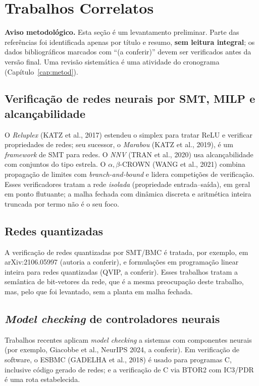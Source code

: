 \chapter{Trabalhos Correlatos}\label{cap:corr}

\textbf{Aviso metodológico.} Esta seção é um levantamento preliminar. Parte das referências foi identificada apenas por título e resumo, \textbf{sem leitura integral}; os dados bibliográficos marcados com ``(a conferir)'' devem ser verificados antes da versão final. Uma revisão sistemática é uma atividade do cronograma (Capítulo~\ref{cap:metod}).

\section{Verificação de redes neurais por SMT, MILP e alcançabilidade}

O \emph{Reluplex} (KATZ et al., 2017) estendeu o simplex para tratar ReLU e verificar propriedades de redes; seu sucessor, o \emph{Marabou} (KATZ et al., 2019), é um \emph{framework} de SMT para redes. O \emph{NNV} (TRAN et al., 2020) usa alcançabilidade com conjuntos do tipo estrela. O $\alpha,\beta$-CROWN (WANG et al., 2021) combina propagação de limites com \emph{branch-and-bound} e lidera competições de verificação. Esses verificadores tratam a rede \emph{isolada} (propriedade entrada--saída), em geral em ponto flutuante; a malha fechada com dinâmica discreta e aritmética inteira truncada por termo não é o seu foco.

\section{Redes quantizadas}

A verificação de redes quantizadas por SMT/BMC é tratada, por exemplo, em arXiv:2106.05997 (autoria a conferir), e formulações em programação linear inteira para redes quantizadas (QVIP, a conferir). Esses trabalhos tratam a semântica de bit-vetores da rede, que é a mesma preocupação deste trabalho, mas, pelo que foi levantado, sem a planta em malha fechada.

\section{\emph{Model checking} de controladores neurais}

Trabalhos recentes aplicam \emph{model checking} a sistemas com componentes neurais (por exemplo, Giacobbe et al., NeurIPS 2024, a conferir). Em verificação de software, o ESBMC (GADELHA et al., 2018) é usado para programas C, inclusive código gerado de redes; e a verificação de C via BTOR2 com IC3/PDR é uma rota estabelecida.

